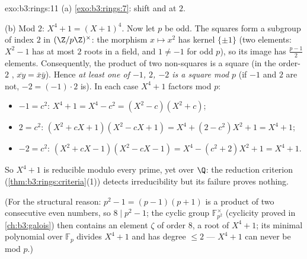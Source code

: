 \begin{solution}{exo:b3:rings:11}
(a) \cref{exo:b3:rings:7}: shift and  at $2$.

(b) Mod $2$: $X^4 + 1 = (X + 1)^4$. Now let $p$ be odd. The
squares form a subgroup of index $2$ in $(\Z/p\Z)^\times$: the
morphism $x \mapsto x^2$ has kernel $\{\pm 1\}$ (two elements: $X^2
- 1$ has at most $2$ roots in a field, and $1 \neq -1$ for odd
$p$), so its image has $\frac{p-1}2$ elements. Consequently, the
product of two non-squares is a square (in the order-$2$ , $\overline{xy} = \bar x\bar y$). Hence \emph{at least one
of $-1$, $2$, $-2$ is a square mod $p$} (if $-1$ and $2$ are not,
$-2 = (-1)\cdot 2$ is). In each case $X^4 + 1$ factors mod $p$:
\begin{itemize}
  \item $-1 = c^2$: \quad $X^4 + 1 = X^4 - c^2 = (X^2 - c)(X^2 +
        c)$;
  \item $2 = c^2$: \quad $(X^2 + cX + 1)(X^2 - cX + 1) = X^4 + (2
        - c^2)X^2 + 1 = X^4 + 1$;
  \item $-2 = c^2$: \quad $(X^2 + cX - 1)(X^2 - cX - 1) = X^4 -
        (c^2 + 2)X^2 + 1 = X^4 + 1$.
\end{itemize}
So $X^4+1$ is reducible modulo every prime, yet  over
$\Q$: the reduction criterion (\cref{thm:b3:rings:criteria}(1))
detects irreducibility but its failure proves nothing.

(For the structural reason: $p^2 - 1 = (p-1)(p+1)$ is a product of
two consecutive even numbers, so $8 \mid p^2 - 1$; the cyclic
group $\mathbb F_{p^2}^\times$ (cyclicity proved in
\cref{ch:b3:galois}) then contains an element $\zeta$ of order
$8$, a root of $X^4 + 1$; its minimal polynomial over $\mathbb
F_p$ divides $X^4+1$ and has degree $\leq 2$ --- $X^4+1$ can never
be  mod $p$.)
\end{solution}

